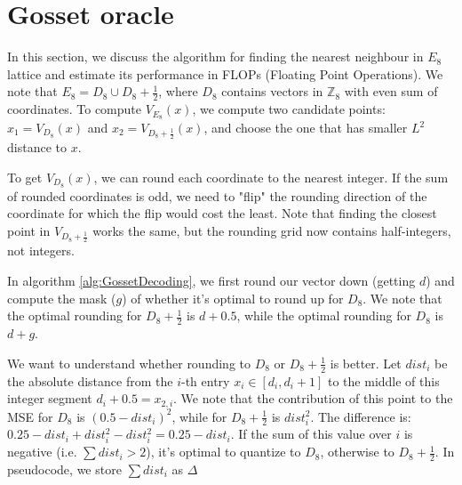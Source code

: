 \documentclass{article}
\def\EE{\mathbb{E}}
\newcommand{\Z}{\mathbb{Z}}
\newcommand{\trace}{\mathop{\mathrm{tr}}}
\theoremstyle{plain}
\theoremstyle{definition}
\theoremstyle{remark}
\begin{document}



\section{Gosset oracle}
\label{sec:oracle}
In this section, we discuss the algorithm for finding the nearest neighbour in $E_8$ lattice and estimate its performance in FLOPs (Floating Point Operations). We note that $E_8 = D_8 \cup D_8 + \frac{1}{2}$, where $D_8$ contains vectors in $\Z_8$ with even sum of coordinates. To compute $V_{E_8}(x)$, we compute two candidate points: $x_1 = V_{D_8}(x)$ and $x_2 = V_{D_8 + \frac{1}{2}}(x)$, and choose the one that has smaller $L^2$ distance to $x$.

To get $V_{D_8}(x)$, we can round each coordinate to the nearest integer. If the sum of rounded coordinates is odd, we need to "flip" the rounding direction of the coordinate for which the flip would cost the least. Note that finding the closest point in $V_{D_8 + \frac{1}{2}}$ works the same, but the rounding grid now contains half-integers, not integers.

In algorithm \ref{alg:GossetDecoding}, we first round our vector down (getting $d$) and compute the mask ($g$) of whether it's optimal to round up for $D_8$. We note that the optimal rounding for $D_8 + \frac{1}{2}$ is $d + 0.5$, while the optimal rounding for $D_8$ is $d + g$. 

We want to understand whether rounding to $D_8$ or $D_8 + \frac{1}{2}$ is better. Let $dist_i$ be the absolute distance from the $i$-th entry $x_i \in [d_i, d_i+1]$ to the middle of this integer segment $d_i + 0.5 = x_{2, i}$. We note that the contribution of this point to the MSE for $D_8$ is $(0.5-dist_i)^2$, while for $D_8+\frac{1}{2}$ is $dist_i^2$. The difference is: $0.25 - dist_i + dist_i^2 - dist_i^2 = 0.25 - dist_i$. If the sum of this value over $i$ is negative (i.e. $\sum dist_i > 2$), it's optimal to quantize to $D_8$, otherwise to $D_8 + \frac{1}{2}$. In pseudocode, we store $\sum dist_i$ as $\Delta$
\end{document}
